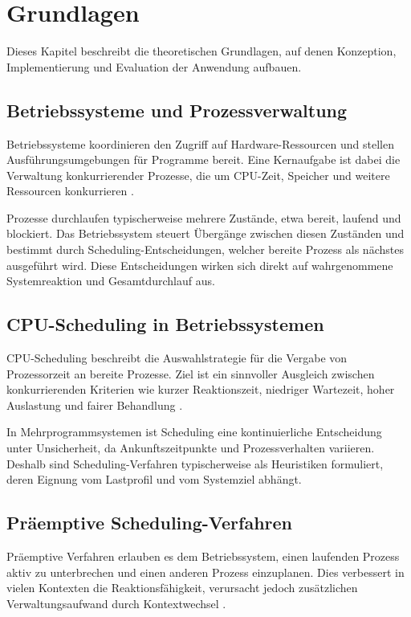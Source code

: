 \chapter{Grundlagen}

Dieses Kapitel beschreibt die theoretischen Grundlagen, auf denen Konzeption, Implementierung und Evaluation der Anwendung aufbauen.

\section{Betriebssysteme und Prozessverwaltung}

Betriebssysteme koordinieren den Zugriff auf Hardware-Ressourcen und stellen Ausführungsumgebungen für Programme bereit. Eine Kernaufgabe ist dabei die Verwaltung konkurrierender Prozesse, die um CPU-Zeit, Speicher und weitere Ressourcen konkurrieren \cite{silberschatz2018operating,tanenbaum2014modern}.

Prozesse durchlaufen typischerweise mehrere Zustände, etwa bereit, laufend und blockiert. Das Betriebssystem steuert Übergänge zwischen diesen Zuständen und bestimmt durch Scheduling-Entscheidungen, welcher bereite Prozess als nächstes ausgeführt wird. Diese Entscheidungen wirken sich direkt auf wahrgenommene Systemreaktion und Gesamtdurchlauf aus.

\section{CPU-Scheduling in Betriebssystemen}

CPU-Scheduling beschreibt die Auswahlstrategie für die Vergabe von Prozessorzeit an bereite Prozesse. Ziel ist ein sinnvoller Ausgleich zwischen konkurrierenden Kriterien wie kurzer Reaktionszeit, niedriger Wartezeit, hoher Auslastung und fairer Behandlung \cite{pinedo2016scheduling,silberschatz2018operating}.

In Mehrprogrammsystemen ist Scheduling eine kontinuierliche Entscheidung unter Unsicherheit, da Ankunftszeitpunkte und Prozessverhalten variieren. Deshalb sind Scheduling-Verfahren typischerweise als Heuristiken formuliert, deren Eignung vom Lastprofil und vom Systemziel abhängt.

\section{Präemptive Scheduling-Verfahren}

Präemptive Verfahren erlauben es dem Betriebssystem, einen laufenden Prozess aktiv zu unterbrechen und einen anderen Prozess einzuplanen. Dies verbessert in vielen Kontexten die Reaktionsfähigkeit, verursacht jedoch zusätzlichen Verwaltungsaufwand durch Kontextwechsel \cite{tanenbaum2014modern,silberschatz2018operating}.

